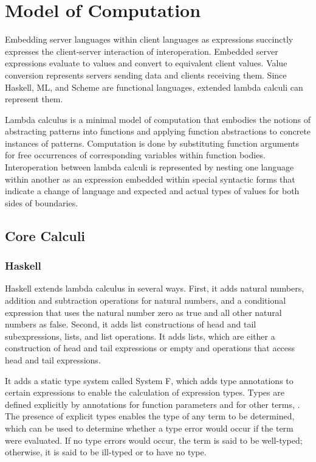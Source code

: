 \chapter{Model of Computation}

Embedding server languages within client languages as expressions succinctly expresses the client-server interaction of interoperation.  Embedded server expressions evaluate to values and convert to equivalent client values.  Value conversion represents servers sending data and clients receiving them.  Since Haskell, ML, and Scheme are functional languages, extended lambda calculi can represent them.

Lambda calculus is a minimal model of computation that embodies the notions of abstracting patterns into functions and applying function abstractions to concrete instances of patterns.  Computation is done by substituting function arguments for free occurrences of corresponding variables within function bodies.  Interoperation between lambda calculi is represented by nesting one language within another as an expression embedded within special syntactic forms that indicate a change of language and expected and actual types of values for both sides of boundaries.

\section{Core Calculi}

\subsection{Haskell}

Haskell extends lambda calculus in several ways.  First, it adds natural numbers, addition and subtraction operations for natural numbers, and a conditional expression that uses the natural number zero as true and all other natural numbers as false.  Second, it adds list constructions of head and tail subexpressions, lists, and list operations.  It adds lists, which are either a construction of head and tail expressions or empty and operations that access head and tail expressions.

It adds a static type system called System F, which adds type annotations to certain expressions to enable the calculation of expression types.  Types are defined explicitly by annotations for function parameters and for other terms, .  The presence of explicit types enables the type of any term to be determined, which can be used to determine whether a type error would occur if the term were evaluated.  If no type errors would occur, the term is said to be well-typed; otherwise, it is said to be ill-typed or to have no type.  

